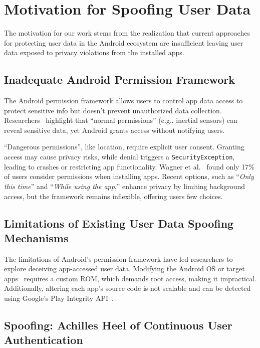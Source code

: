 \section{Motivation for Spoofing User Data}
\label{sec:motivation}

The motivation for our work stems from the realization that current approaches for protecting user data in the Android ecosystem are insufficient leaving user data exposed to privacy violations from the installed apps. 

\subsection{Inadequate Android Permission Framework}

The Android permission framework allows users to control app data access to protect sensitive info but doesn't prevent unauthorized data collection. Researchers~\cite{hasan2013sensing, simon2013pin, ba2020learning, shen2015input, lin2019motion} highlight that ``normal permissions'' (e.g., inertial sensors) can reveal sensitive data, yet Android grants access without notifying users.

``Dangerous permissions'', like location, require explicit user consent. Granting access may cause privacy risks, while denial triggers a \texttt{SecurityException}, leading to crashes or restricting app functionality. Wagner et al.~\cite{wijesekera2017feasibility} found only 17\% of users consider permissions when installing apps. Recent options, such as ``\textit{Only this time}'' and ``\textit{While using the app},'' enhance privacy by limiting background access, but the framework remains inflexible, offering users few choices.


\subsection{Limitations of Existing User Data Spoofing Mechanisms}

The limitations of Android's permission framework have led researchers to explore deceiving app-accessed user data. Modifying the Android OS or target apps~\cite{backes2015boxify, jeon2012dr, raval2016you, smalley2013security, wu2017context} requires a custom ROM, which demands root access, making it impractical. Additionally, altering each app's source code is not scalable and can be detected using Google's Play Integrity API~\cite{andPlayIntAPI}.


\subsection{Spoofing: Achilles Heel of Continuous User Authentication}
\label{sec:continuous_authentication_mechanisms}

